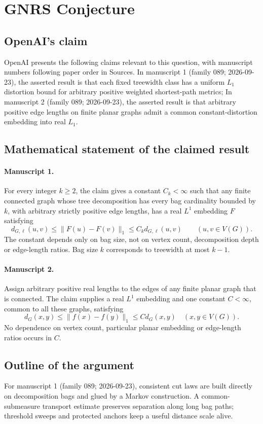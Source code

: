 \documentclass[11pt]{article}
\begin{document}
\section*{GNRS Conjecture}

\subsection{OpenAI's claim}
OpenAI presents the following claims relevant to this question, with manuscript numbers following paper order in Sources. In manuscript 1 (family 089; 2026-09-23), the asserted result is that each fixed treewidth class has a uniform $L_1$ distortion bound for arbitrary positive weighted shortest-path metrics; In manuscript 2 (family 089; 2026-09-23), the asserted result is that arbitrary positive edge lengths on finite planar graphs admit a common constant-distortion embedding into real $L_1$.

\subsection{Mathematical statement of the claimed result}
\paragraph{Manuscript 1.}
For every integer $k\ge2$, the claim gives a constant $C_k<\infty$ such that any finite connected graph whose tree decomposition has every bag cardinality bounded by $k$, with arbitrary strictly positive edge lengths, has a real $L^1$ embedding $F$ satisfying
\[
 d_{G,\ell}(u,v)\le\|F(u)-F(v)\|_1\le C_kd_{G,\ell}(u,v)
 \qquad(u,v\in V(G)).
\]
The constant depends only on bag size, not on vertex count, decomposition depth or edge-length ratios. Bag size $k$ corresponds to treewidth at most $k-1$.

\paragraph{Manuscript 2.}
Assign arbitrary positive real lengths to the edges of any finite planar graph that is connected. The claim supplies a real $L^1$ embedding and one constant $C<\infty$, common to all these graphs, satisfying
\[
 d_G(x,y)\le\|f(x)-f(y)\|_1\le C d_G(x,y)\quad(x,y\in V(G)).
\]
No dependence on vertex count, particular planar embedding or edge-length ratios occurs in $C$.

\subsection{Outline of the argument}
For manuscript 1 (family 089; 2026-09-23), consistent cut laws are built directly on decomposition bags and glued by a Markov construction. A common-submeasure transport estimate preserves separation along long bag paths; threshold sweeps and protected anchors keep a useful distance scale alive.
\end{document}
